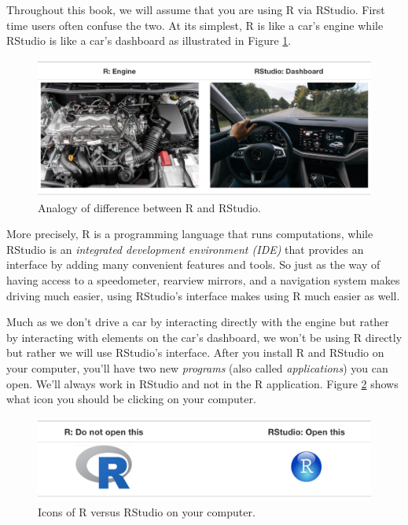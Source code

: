 \documentclass[
  12pt,
  oneside]{book}
\theoremstyle{definition}
\theoremstyle{definition}
\theoremstyle{definition}
\theoremstyle{definition}
\theoremstyle{remark}
\begin{document}
Throughout this book, we will assume that you are using R via RStudio. First time users often confuse the two. At its simplest, R is like a car's engine while RStudio is like a car's dashboard as illustrated in Figure \ref{fig:R-vs-RStudio-1}.

\begin{figure}
\includegraphics[width=0.95\linewidth]{fig/R_vs_RStudio_1} \caption{Analogy of difference between R and RStudio.}\label{fig:R-vs-RStudio-1}
\end{figure}

More precisely, R is a programming language that runs computations, while RStudio is an \emph{integrated development environment (IDE)} that provides an interface by adding many convenient features and tools. So just as the way of having access to a speedometer, rearview mirrors, and a navigation system makes driving much easier, using RStudio's interface makes using R much easier as well.

Much as we don't drive a car by interacting directly with the engine but rather by interacting with elements on the car's dashboard, we won't be using R directly but rather we will use RStudio's interface. After you install R and RStudio on your computer, you'll have two new \emph{programs} (also called \emph{applications}) you can open. We'll always work in RStudio and not in the R application. Figure \ref{fig:R-vs-RStudio-2a} shows what icon you should be clicking on your computer.

\begin{figure}
\includegraphics[width=0.9\linewidth]{fig/R_vs_RStudio} \caption{Icons of R versus RStudio on your computer.}\label{fig:R-vs-RStudio-2a}
\end{figure}
\end{document}
